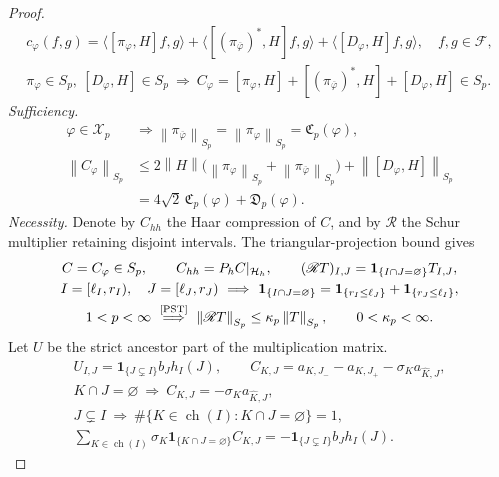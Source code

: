 \documentclass[11pt]{amsart}
\newcommand{\X}{\mathcal X}
\newcommand{\ip}[2]{\langle #1,#2\rangle}
\newcommand{\norm}[1]{\left\|#1\right\|}
\newcommand{\ch}{\operatorname{ch}}
\begin{document}
\begin{proof}
\begin{equation}
 \begin{gathered}
 c_\varphi(f,g)
  =\ip{[\pi_\varphi,H]f}{g}
    +\ip{[(\pi_{\overline\varphi})^*,H]f}{g}
    +\ip{[D_\varphi,H]f}{g},\quad f,g\in\mathscr F,\\
 \pi_\varphi\in S_p,\ [D_\varphi,H]\in S_p
 \ \Longrightarrow\
 C_\varphi=[\pi_\varphi,H]+[(\pi_{\overline\varphi})^*,H]
                                    +[D_\varphi,H]\in S_p.
 \end{gathered}
\end{equation}
\emph{Sufficiency.}
\begin{align*}
 \varphi\in\X_p
 &\Longrightarrow
 \norm{\pi_{\overline\varphi}}_{S_p}
        =\norm{\pi_\varphi}_{S_p}=\mathfrak C_p(\varphi),\\
 \norm{C_\varphi}_{S_p}
 &\le2\norm H\big(\norm{\pi_\varphi}_{S_p}
                      +\norm{\pi_{\overline\varphi}}_{S_p}\big)
                       +\norm{[D_\varphi,H]}_{S_p}\\
 &=4\sqrt2\,\mathfrak C_p(\varphi)+\mathfrak D_p(\varphi).
\end{align*}
\emph{Necessity.} Denote by $C_{hh}$ the Haar compression of $C$,
and by $\mathscr R$ the Schur multiplier retaining disjoint intervals.
The triangular-projection bound gives
\begin{gather*}
 C=C_\varphi\in S_p,\qquad C_{hh}=P_hC|_{\mathcal H_h},\qquad
 (\mathscr RT)_{I,J}=\mathbf1_{\{I\cap J=\varnothing\}}T_{I,J},\\
 I=[\ell_I,r_I),\quad J=[\ell_J,r_J)
 \ \Longrightarrow\
 \mathbf1_{\{I\cap J=\varnothing\}}
   =\mathbf1_{\{r_I\le\ell_J\}}
      +\mathbf1_{\{r_J\le\ell_I\}},\\
 1<p<\infty
 \ \overset{\text{\cite[\S 2.4]{PST}}}{\Longrightarrow}\
 \norm{\mathscr RT}_{S_p}\le\kappa_p\norm T_{S_p},\qquad
 0<\kappa_p<\infty.
\end{gather*}
Let $U$ be the strict ancestor part of the multiplication matrix.
\begin{gather*}
 U_{I,J}=\mathbf1_{\{J\subsetneq I\}}b_Jh_I(J),\qquad
 C_{K,J}=a_{K,J_-}-a_{K,J_+}-\sigma_K a_{\widehat K,J},\\
 K\cap J=\varnothing
 \ \Longrightarrow\ C_{K,J}=-\sigma_Ka_{\widehat K,J},\\
 J\subsetneq I
 \ \Longrightarrow\
 \#\{K\in\ch(I):K\cap J=\varnothing\}=1,\\
 \sum_{K\in\ch(I)}\sigma_K
       \mathbf1_{\{K\cap J=\varnothing\}}C_{K,J}
      =-\mathbf1_{\{J\subsetneq I\}}b_Jh_I(J).
\end{gather*}

\end{proof}
\end{document}
